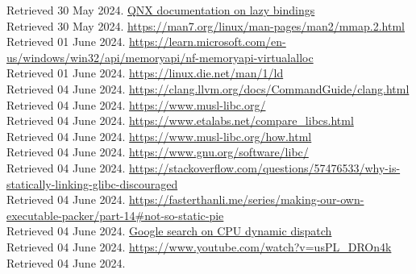 \documentclass[12pt]{article}
\begin{document}
\begin{thebibliography}{9}
		Retrieved 30 May 2024.
		\href{https://www.qnx.com/developers/docs/8.0/com.qnx.doc.neutrino.prog/topic/devel_Lazy_binding.html}{QNX documentation on lazy bindings}\\
		Retrieved 30 May 2024.
		\href{https://man7.org/linux/man-pages/man2/mmap.2.html}{https://man7.org/linux/man-pages/man2/mmap.2.html}\\
		Retrieved 01 June 2024.
		\href{https://learn.microsoft.com/en-us/windows/win32/api/memoryapi/nf-memoryapi-virtualalloc}{https://learn.microsoft.com/en-us/windows/win32/api/memoryapi/nf-memoryapi-virtualalloc}\\
		Retrieved 01 June 2024.
		\href{https://linux.die.net/man/1/ld}{https://linux.die.net/man/1/ld}\\
		Retrieved 04 June 2024.
		\href{https://clang.llvm.org/docs/CommandGuide/clang.html}{https://clang.llvm.org/docs/CommandGuide/clang.html}\\
		Retrieved 04 June 2024.
		\href{https://www.musl-libc.org/}{https://www.musl-libc.org/}\\
		Retrieved 04 June 2024.
		\href{https://www.etalabs.net/compare_libcs.html}{https://www.etalabs.net/compare\_libcs.html}\\
		Retrieved 04 June 2024.
		\href{https://www.musl-libc.org/how.html}{https://www.musl-libc.org/how.html}\\
		Retrieved 04 June 2024.
		\href{https://www.gnu.org/software/libc/}{https://www.gnu.org/software/libc/}\\
		Retrieved 04 June 2024.
		\href{https://stackoverflow.com/questions/57476533/why-is-statically-linking-glibc-discouraged}{https://stackoverflow.com/questions/57476533/why-is-statically-linking-glibc-discouraged}\\
		Retrieved 04 June 2024.
		\href{https://fasterthanli.me/series/making-our-own-executable-packer/part-14#not-so-static-pie}{https://fasterthanli.me/series/making-our-own-executable-packer/part-14\#not-so-static-pie}\\
		Retrieved 04 June 2024.
		\href{https://www.google.com/search?q=picking+avx+or+sse+instruction+set+function&oq=picking+avx+or+sse+instruction+set+function}{Google search on CPU dynamic dispatch}\\
		Retrieved 04 June 2024.
		\href{https://www.youtube.com/watch?v=usPL_DROn4k}{https://www.youtube.com/watch?v=usPL\_DROn4k}\\
		Retrieved 04 June 2024.
	\end{thebibliography}
\end{document}
